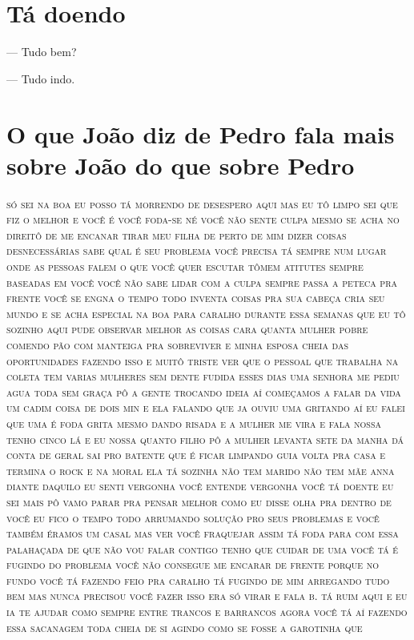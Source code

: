 \chapter{Tá doendo}

— Tudo bem?

— Tudo indo.

\chapter{O que João diz de Pedro fala mais sobre João do que sobre Pedro}

\textsc{só sei na boa eu posso tá morrendo de desespero aqui mas eu tô limpo sei
que fiz o melhor e você é você foda-se né você não sente culpa mesmo se
acha no direitô de me encanar tirar meu filha de perto de mim dizer
coisas desnecessárias sabe qual é seu problema você precisa tá sempre
num lugar onde as pessoas falem o que você quer escutar tômem atitutes
sempre baseadas em você você não sabe lidar com a culpa sempre passa a
peteca pra frente você se engna o tempo todo inventa coisas pra sua
cabeça cria seu mundo e se acha especial na boa para caralho durante
essa semanas que eu tô sozinho aqui pude observar melhor as coisas cara
quanta mulher pobre comendo pão com manteiga pra sobreviver e minha
esposa cheia das oportunidades fazendo isso e muitô triste ver que o
pessoal que trabalha na coleta tem varias mulheres sem dente fudida
esses dias uma senhora me pediu agua toda sem graça pô a gente trocando
ideia aí começamos a falar da vida um cadim coisa de dois min e ela
falando que ja ouviu uma gritando aí eu falei que uma é foda grita mesmo
dando risada e a mulher me vira e fala nossa tenho cinco lá e eu nossa
quanto filho pô a mulher levanta sete da manha dá conta de geral sai pro
batente que é ficar limpando guia volta pra casa e termina o rock e na
moral ela tá sozinha não tem marido não tem mãe anna diante daquilo eu
senti vergonha você entende vergonha você tá doente eu sei mais pô vamo
parar pra pensar melhor como eu disse olha pra dentro de você eu fico o
tempo todo arrumando solução pro seus problemas e você também éramos um
casal mas ver você fraquejar assim tá foda para com essa palahaçada de
que não vou falar contigo tenho que cuidar de uma você tá é fugindo do
problema você não consegue me encarar de frente porque no fundo você tá
fazendo feio pra caralho tá fugindo de mim arregando tudo bem mas nunca
precisou você fazer isso era só virar e fala b. tá ruim aqui e eu ia te
ajudar como sempre entre trancos e barrancos agora você tá aí fazendo
essa sacanagem toda cheia de si agindo como se fosse a garotinha que
}
